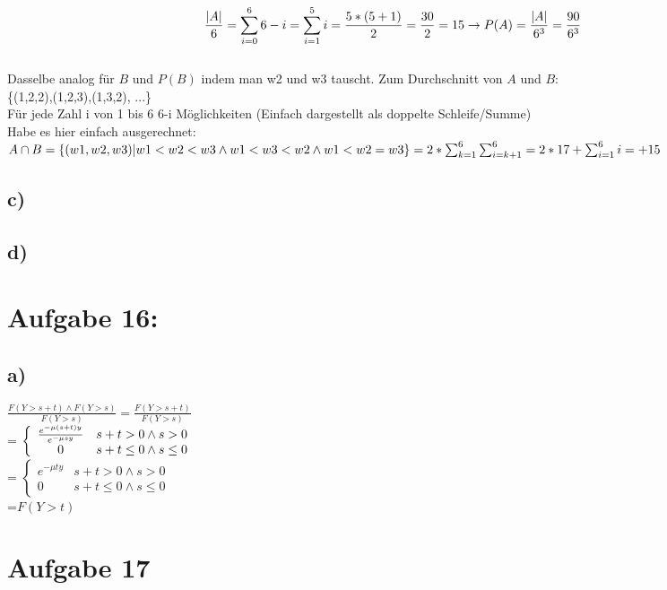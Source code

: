 \documentclass[11pt]{article} %
\begin{document}
{$$\frac{|A|}{6}=\sum_{i=0}^{6} 6-i = \sum_{i=1}^{5} i = \frac{5*(5+1)}{2}=\frac{30}{2}=15
\\
\rightarrow P(A)=\frac{|A|}{6^3} = \frac{90}{6^3}$$ \\
Dasselbe analog für $B$ und $P(B)$ indem man w2 und w3 tauscht.
Zum Durchschnitt von $A$ und $B$:\\
\{(1,2,2),(1,2,3),(1,3,2), ...\}\\
Für jede Zahl i  von 1 bis 6 6-i Möglichkeiten (Einfach dargestellt als doppelte Schleife/Summe) \\
Habe es hier einfach ausgerechnet:
$A\cap B = \{(w1,w2,w3)|w1<w2< w3 \land w1 <w3<w2  \land w1<w2=w3\}\\ =2 * \sum_{k=1}^{6} \sum_{i=k+1}^{6} =2 * 17    +\sum_{i=1}^{6} i =   +15  $\\

\subsection*{c)}
\subsection*{d)}
\section*{\textbf Aufgabe 16:}

\subsection*{a)}
$\frac{ F(Y >s+t) \land F(Y>s)}{F(Y>s)} = \frac{F(Y>s+t)}{F(Y>s)}$\\
= $\left\{\\
\begin{array}{cc}
  \frac{e^{-\mu (s+t)y}}{e^{-\mu s y}}   & s+t > 0 \land s  > 0 \\
  0 & s+t \leq 0 \land s \leq 0 
\end{array}\right. $\\
= $\left\{
 \begin{array}{cc}
  e^{-\mu t y}   & s+t > 0 \land s  >0 \\
  0 & s+t \leq 0 \land s \leq 0
\end{array} \right. $
\\=$F(Y>t)$
\section*{\textbf Aufgabe 17}
}
\end{document}
